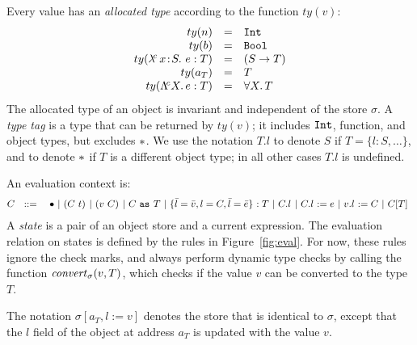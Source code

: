 \documentclass{article}
\newcommand{\fun}[1]{\mbox{\it #1\/}}
\newcommand{\safe}{\bullet}
\newcommand{\lam}[5]{\lambda\!^{#1}\,#2\!:\!#3.\,\,#5:#4}
\newcommand{\lamt}[2]{#1\rightarrow #2}
\newcommand{\app}[3]{(#2~#3)^{#1}}
\newcommand{\Int}{\t{Int}}
\newcommand{\Bool}{\t{Bool}}
\newcommand{\dynamic}{\t{*}}
\newcommand{\hole}{\safe}
\newcommand{\Lam}[4]{\Lambda\!^{#1} #2.\,#3:#4}
\newcommand{\App}[2]{#1[#2]}
\newcommand{\Forall}[2]{\forall #1.\,#2}
\newcommand{\cast}[3]{#2~\t{as}^{#1}~#3}
\newcommand{\convert}[2]{{#1}\convertword{#2}}
\newcommand{\convertword}{\mbox{\,\,$\sim :$\,\,}}
\renewcommand{\t}[1]{{\tt #1}}
\newcommand{\objty}[1]{\{#1\}}
\newcommand{\obje}[3]{\{#2\}^{#1}:{#3}}
\newcommand{\objget}[3]{#2.#3^{#1}}
\newcommand{\objset}[4]{#2.#3^{#1}:=#4}
\newcommand{\wrap}[2]{#1~\t{wrapXXXXXXXXXXXXX}~#2}
\newcommand{\allocty}[1]{ty(#1)}
\renewcommand{\convert}[2]{\fun{convert}_{\sigma}(#1,#2)}
\begin{document}
Every value has an \emph{allocated type} according to the function $\allocty{v}$:
\[
\begin{array}{rcll}
		\allocty{n}&=&\Int \\
		\allocty{b}&=&\Bool\\
		\allocty{\lam{c}{x}{S}{T}{e}}&=&(\lamt{S}{T})\\
		\allocty{a_T}&=&T   \\
		\allocty{\Lam c X e T} &=& \Forall X T
\end{array}
\]
The allocated type of an object is invariant and independent of the store $\sigma$. 
A \emph{type tag} is a type that can be returned by $\allocty{v}$; it includes $\Int$, function, and object types, but excludes $\dynamic$. 
We use the notation $T.l$ to denote $S$ if $T=\objty{l:S,\dots}$, and to denote $\dynamic$ if $T$ is a different object type; in all other cases $T.l$ is undefined.

An evaluation context is:
\[
C ~~::=
\begin{array}[t]{@{}l}
		~~~\hole
	~|~	\app{}{C}{t} 
	~|~	\app{}{v}{C}
	~|~ \cast{}{C}{T} 
	~|~ \obje{}{\bar l=\bar v,l=C, \bar l =\bar e}{T}
	~|~ \objget{}{C}{l}
	~|~ \objset{}{C}{l}{e}
	~|~ \objset{}{v}{l}{C} 
	~|~ \App{C}{T}
\end{array}
\]
A \emph{state} is a pair of an object store and a current expression.
The evaluation relation on states is defined by the rules in Figure~\ref{fig:eval}.
For now, these rules ignore the check marks, and always perform dynamic type checks by calling the function $\convert{v}{T}$, which checks if the value $v$ can be converted to the type $T$. 

The notation $\sigma[a_T,l:=v]$ denotes the store that is identical to $\sigma$, except that the $l$ field of the object at address $a_T$ is updated with the value $v$.
\end{document}
